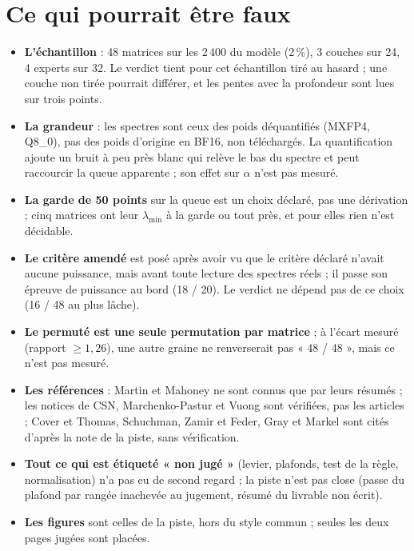 \section{Ce qui pourrait être faux}\label{t3spe:sec:faux}

\begin{faux}
\begin{itemize}
\item \textbf{L'échantillon} : 48 matrices sur les 2\,400 du modèle (2\,\%), 3 couches sur 24, 4 experts sur 32. Le verdict tient pour cet échantillon tiré au hasard ; une couche non tirée pourrait différer, et les pentes avec la profondeur sont lues sur trois points.
\item \textbf{La grandeur} : les spectres sont ceux des poids déquantifiés (MXFP4, Q8\_0), pas des poids d'origine en BF16, non téléchargés. La quantification ajoute un bruit à peu près blanc qui relève le bas du spectre et peut raccourcir la queue apparente ; son effet sur $\alpha$ n'est pas mesuré.
\item \textbf{La garde de 50 points} sur la queue est un choix déclaré, pas une dérivation ; cinq matrices ont leur $\lambda_{\min}$ à la garde ou tout près, et pour elles rien n'est décidable.
\item \textbf{Le critère amendé} est posé après avoir vu que le critère déclaré n'avait aucune puissance, mais avant toute lecture des spectres réels ; il passe son épreuve de puissance au bord (18 / 20). Le verdict ne dépend pas de ce choix (16 / 48 au plus lâche).
\item \textbf{Le permuté est une seule permutation par matrice} ; à l'écart mesuré (rapport $\ge 1{,}26$), une autre graine ne renverserait pas « 48 / 48 », mais ce n'est pas mesuré.
\item \textbf{Les références} : Martin et Mahoney ne sont connus que par leurs résumés ; les notices de CSN, Marchenko-Pastur et Vuong sont vérifiées, pas les articles ; Cover et Thomas, Schuchman, Zamir et Feder, Gray et Markel sont cités d'après la note de la piste, sans vérification.
\item \textbf{Tout ce qui est étiqueté « non jugé »} (levier, plafonds, test de la règle, normalisation) n'a pas eu de second regard ; la piste n'est pas close (passe du plafond par rangée inachevée au jugement, résumé du livrable non écrit).
\item \textbf{Les figures} sont celles de la piste, hors du style commun ; seules les deux pages jugées sont placées.
\end{itemize}
\end{faux}
